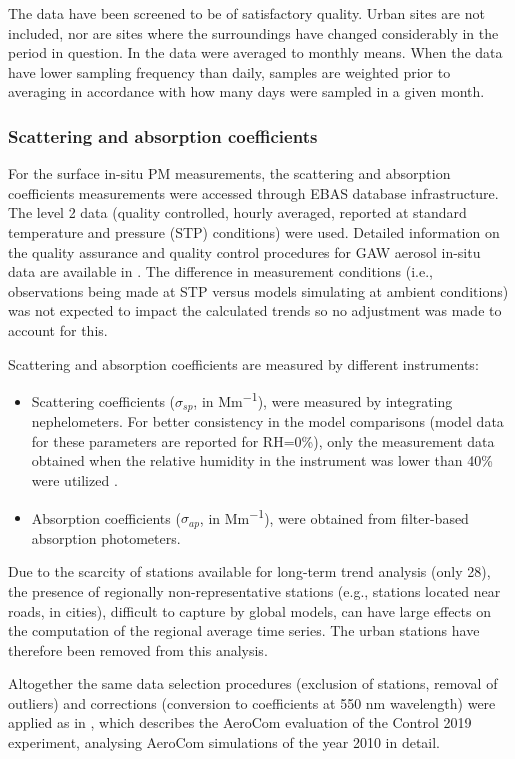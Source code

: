 \documentclass[acp, manuscript]{copernicus}
\begin{document}
The data have been screened to be of satisfactory quality. Urban sites are not included, nor are sites where the surroundings have changed considerably in the period in question.
In \cite{aas2019global} the data  were averaged to monthly means.  When the data have lower sampling frequency than daily, samples are weighted prior to averaging in accordance with how many days were sampled in a given month.

\subsubsection{Scattering and absorption coefficients}
For the surface in-situ PM measurements, the scattering and absorption coefficients measurements were accessed through EBAS database infrastructure. The level 2 data (quality controlled, hourly averaged, reported at standard temperature and pressure (STP) conditions) were used. Detailed information on the quality assurance and quality control procedures for GAW aerosol in-situ data are available in \citep{laj-2019-499}.  The difference in measurement conditions (i.e., observations being made at STP versus models simulating at ambient conditions) was not expected to impact the calculated trends so no adjustment was made to account for this.

  Scattering and absorption coefficients are measured by different instruments:

\begin{itemize}
 \item Scattering coefficients ($\sigma_{sp}$, in \unit{Mm^{-1}}), were measured by integrating nephelometers. For better consistency in the model comparisons (model data for these parameters are reported for RH=0\%), only the measurement data obtained when the relative humidity in the instrument was lower than 40\% were utilized \citep{pandolfi2018european}.
 \item Absorption coefficients ($\sigma_{ap}$, in \unit{Mm^{-1}}), were obtained from filter-based absorption photometers.
\end{itemize}

Due to the scarcity of stations available for long-term trend analysis (only 28), the presence of regionally non-representative stations (e.g., stations located near roads, in cities), difficult to capture by global models, can have large effects on the computation of the regional average time series. The urban stations have therefore been removed from this analysis.

Altogether the same data selection procedures (exclusion of stations, removal of outliers) and corrections (conversion to coefficients at 550 nm wavelength) were applied as in \cite{jonaseval}, which describes the AeroCom evaluation of the Control 2019 experiment, analysing AeroCom simulations of the year 2010 in detail.
\end{document}
